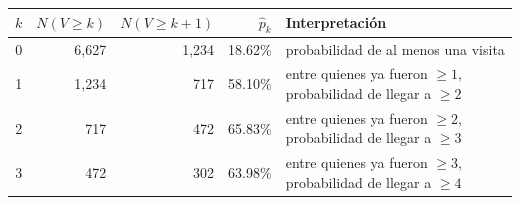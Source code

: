 \begin{tabular}{rrrrp{6.3cm}}
\toprule
$k$ & $N(V\ge k)$ & $N(V\ge k+1)$ & $\hat p_k$ & Interpretación \\
\midrule
0 & 6,627 & 1,234 & 18.62\% & probabilidad de al menos una visita \\
1 & 1,234 & 717 & 58.10\% & entre quienes ya fueron $\ge1$, probabilidad de llegar a $\ge2$ \\
2 & 717 & 472 & 65.83\% & entre quienes ya fueron $\ge2$, probabilidad de llegar a $\ge3$ \\
3 & 472 & 302 & 63.98\% & entre quienes ya fueron $\ge3$, probabilidad de llegar a $\ge4$ \\
\bottomrule
\end{tabular}
